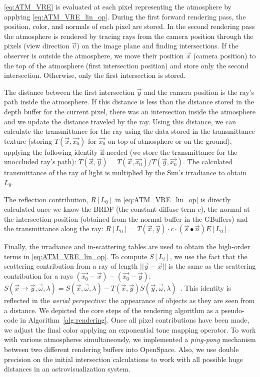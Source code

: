 \documentclass[journal]{vgtc}                %
\begin{document}
\autoref{eq:ATM_VRE} is evaluated at each pixel representing the atmosphere by applying \autoref{eq:ATM_VRE_lin_op}. During the first forward rendering pass, the position, color, and normals of each pixel are stored. In the second rendering pass the atmosphere is rendered by tracing rays from the camera position through the pixels (view direction $\vec{v}$) on the image plane and finding intersections. If the observer is outside the atmosphere, we move their position $\vec{x}$ (camera position) to the top of the atmosphere (first intersection position) and store only the second intersection. Otherwise, only the first intersection is stored.

The distance between the first intersection $\vec{y}$ and the camera position is the ray's path inside the atmosphere. If this distance is less than the distance stored in the depth buffer for the current pixel, there was an intersection inside the atmosphere and we update the distance traveled by the ray. Using this distance, we can calculate the transmittance for the ray using the data stored in the transmittance texture (storing $T(\vec{x}, \vec{x_0})$ for $\vec{x_0}$ on top of atmosphere or on the ground), applying the following identity if needed (we store the transmittance for the unoccluded ray's path): $T(\vec{x}, \vec{y}) = T(\vec{x}, \vec{x_0}) / T(\vec{y}, \vec{x_0})$. The calculated transmittance of the ray of light is multiplied by the Sun's irradiance to obtain $L_0$.

The reflection contribution, $R[L_0]$ in \autoref{eq:ATM_VRE_lin_op} is directly calculated once we know the BRDF (the constant diffuse term $c$), the normal at the intersection position (obtained from the normal buffer in the GBuffers) and the transmittance along the ray: $R[L_0] = T(\vec{x}, \vec{y}) \cdot c \cdot (\vec{s}\bullet\vec{n})E[L_0]$.

Finally, the irradiance and in-scattering tables are used to obtain the high-order terms in \autoref{eq:ATM_VRE_lin_op}. To compute $S[L_i]$, we use the fact that the scattering contribution from a ray of length $||\vec{y}-\vec{x}||$ is the same as the scattering contribution for a rays $(\vec{x_0}-\vec{x}) - (\vec{x_0}-\vec{y})$:  $S(\vec{x}\rightarrow \vec{y}, \vec{\omega}, \lambda) = S(\vec{x}, \vec{\omega}, \lambda) - T(\vec{x}, \vec{y})S(\vec{y}, \vec{\omega}, \lambda)$~\cite{ONeil:2005, Schafhitzel:2007}. This identity is reflected in the \textit{aerial perspective}: the appearance of objects as they are seen from a distance. We depicted the core steps of the rendering algorithm as a pseudo-code in Algorithm~\autoref{alg:rendering}. Once all pixel contributions have been made, we adjust the final color applying an exponential tone mapping operator. To work with various atmospheres simultaneously, we implemented a \textit{ping-pong} mechanism between two different rendering buffers into OpenSpace. Also, we use double precision on the initial intersection calculations to work with all possible huge distances in an astrovisualization system.
\end{document}
